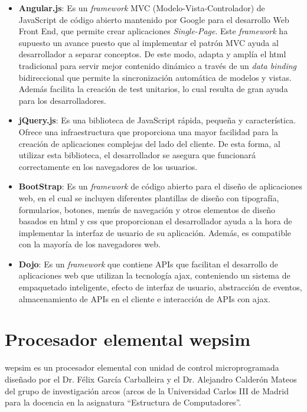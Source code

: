 \begin{itemize}

\item \textbf{Angular.js}: Es un \emph{framework} MVC (Modelo-Vista-Controlador) de JavaScript de código abierto mantenido por Google para el desarrollo Web Front End, que permite crear aplicaciones \textit{Single-Page}. Este \emph{framework} ha supuesto un avance puesto que al implementar el patrón MVC ayuda al desarrollador a separar conceptos. De este modo, adapta y amplía el \acrshort{html} tradicional para servir mejor contenido dinámico a través de un \textit{data binding} bidireccional que permite la sincronización automática de modelos y vistas. Además facilita la creación de test unitarios, lo cual resulta de gran ayuda para los desarrolladores.

\item \textbf{jQuery.js}: Es una biblioteca de JavaScript rápida, pequeña y característica. Ofrece una infraestructura que proporciona una mayor facilidad para la creación de aplicaciones complejas del lado del cliente. De esta forma, al utilizar esta biblioteca, el desarrollador se asegura que funcionará correctamente en los navegadores de los usuarios.

\item \textbf{BootStrap}: Es un \emph{framework} de código abierto para el diseño de aplicaciones web, en el cual se incluyen diferentes plantillas de diseño con tipografía, formularios, botones, menús de navegación y otros elementos de diseño basados en \acrshort{html} y \acrshort{css} que proporcionan el desarrollador ayuda a la hora de implementar la interfaz de usuario de su aplicación. Además, es compatible con la mayoría de los navegadores web.

\item \textbf{Dojo}: Es un \emph{framework} que contiene APIs que facilitan el desarrollo de aplicaciones web que utilizan la tecnología \acrfull{ajax}, conteniendo un sistema de empaquetado inteligente, efecto de interfaz de usuario, abstracción de eventos, almacenamiento de APIs en el cliente e interacción de APIs con \acrshort{ajax}.

\end{itemize}

\section{Procesador elemental \acrshort{wepsim}}
\label{sec:wepsim}

\acrshort{wepsim} es un procesador elemental con unidad de control microprogramada diseñado por el Dr. Félix García Carballeira y el Dr. Alejandro Calderón Mateos del grupo de investigación \acrshort{arcos} (\acrlong{arcos} de la Universidad Carlos III de Madrid para la docencia en la asignatura ``Estructura de Computadores''.

